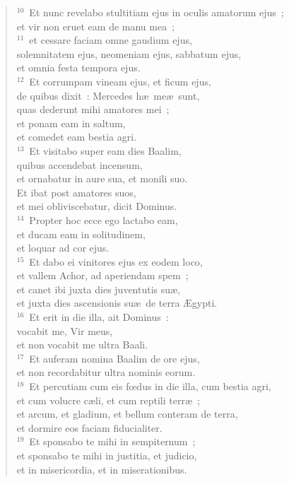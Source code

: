 \begin{flushleft}
\begin{verse}
${}^{10}$~Et nunc revelabo stultitiam ejus in oculis amatorum ejus~;\\ et vir non eruet eam de manu mea~;\\
${}^{11}$~et cessare faciam omne gaudium ejus,\\ solemnitatem ejus, neomeniam ejus, sabbatum ejus,\\ et omnia festa tempora ejus.\\
${}^{12}$~Et corrumpam vineam ejus, et ficum ejus,\\ de quibus dixit~: Mercedes h\ae\ me\ae\ sunt,\\ quas dederunt mihi amatores mei~;\\ et ponam eam in saltum,\\ et comedet eam bestia agri.\\
${}^{13}$~Et visitabo super eam dies Baalim,\\ quibus accendebat incensum,\\ et ornabatur in aure sua, et monili suo.\\ Et ibat post amatores suos,\\ et mei obliviscebatur, dicit Dominus.\\
${}^{14}$~Propter hoc ecce ego lactabo eam,\\ et ducam eam in solitudinem,\\ et loquar ad cor ejus.\\
${}^{15}$~Et dabo ei vinitores ejus ex eodem loco,\\ et vallem Achor, ad aperiendam spem~;\\ et canet ibi juxta dies juventutis su\ae ,\\ et juxta dies ascensionis su\ae\ de terra \AE gypti.\\
${}^{16}$~Et erit in die illa, ait Dominus~:\\ vocabit me, Vir meus,\\ et non vocabit me ultra Baali.\\
${}^{17}$~Et auferam nomina Baalim de ore ejus,\\ et non recordabitur ultra nominis eorum.\\
${}^{18}$~Et percutiam cum eis fœdus in die illa, cum bestia agri,\\ et cum volucre c\ae li, et cum reptili terr\ae~;\\ et arcum, et gladium, et bellum conteram de terra,\\ et dormire eos faciam fiducialiter.\\
${}^{19}$~Et sponsabo te mihi in sempiternum~;\\ et sponsabo te mihi in justitia, et judicio,\\ et in misericordia, et in miserationibus.\\

\end{verse}
\end{flushleft}
